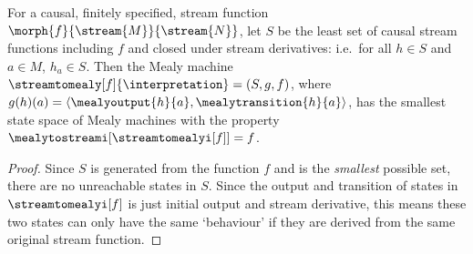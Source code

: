 \begin{corollary}\label{cor:minimal-mealy}
    For a causal, finitely specified, stream function \(
        \morph{f}{\stream{M}}{\stream{N}}
    \), let \(S\) be the least set of
    causal stream functions including \(f\) and closed under stream derivatives:
    i.e.\ for all \(h \in S\) and \(a \in M\), \(h_a \in S\).
    Then the Mealy machine \(
        \streamtomealy[f]{\interpretation} = (S, g, f)
    \), where \(
        g(h)(a) = \langle \mealyoutput{h}{a}, \mealytransition{h}{a}\rangle
    \), has the smallest state space of Mealy machines with the property \(
        \mealytostreami[\streamtomealyi[f]] = f
    \).
\end{corollary}
\begin{proof}
    Since \(S\) is generated from the function \(f\) and is the \emph{smallest}
    possible set, there are no unreachable states in \(S\).
    Since the output and transition of states in
    \(\streamtomealyi[f]\) is just initial output and stream derivative, this
    means these two states can only have the same `behaviour' if they are
    derived from the same original stream function.
\end{proof}